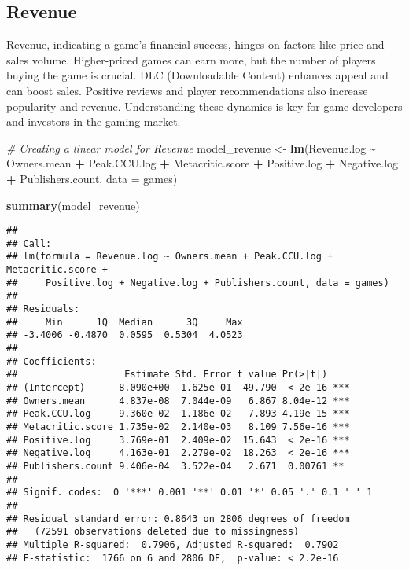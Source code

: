 \documentclass[
]{article}
\newenvironment{Shaded}{\begin{snugshade}}{\end{snugshade}}
\newcommand{\AttributeTok}[1]{\textcolor[rgb]{0.13,0.29,0.53}{#1}}
\newcommand{\CommentTok}[1]{\textcolor[rgb]{0.56,0.35,0.01}{\textit{#1}}}
\newcommand{\FunctionTok}[1]{\textcolor[rgb]{0.13,0.29,0.53}{\textbf{#1}}}
\newcommand{\NormalTok}[1]{#1}
\newcommand{\OtherTok}[1]{\textcolor[rgb]{0.56,0.35,0.01}{#1}}
\newcommand{\SpecialCharTok}[1]{\textcolor[rgb]{0.81,0.36,0.00}{\textbf{#1}}}
\begin{document}
\hypertarget{revenue}{%
\subsection{Revenue}\label{revenue}}

Revenue, indicating a game's financial success, hinges on factors like
price and sales volume. Higher-priced games can earn more, but the
number of players buying the game is crucial. DLC (Downloadable Content)
enhances appeal and can boost sales. Positive reviews and player
recommendations also increase popularity and revenue. Understanding
these dynamics is key for game developers and investors in the gaming
market.

\begin{Shaded}
\begin{Highlighting}[]
\CommentTok{\# Creating a linear model for Revenue}
\NormalTok{model\_revenue }\OtherTok{\textless{}{-}} \FunctionTok{lm}\NormalTok{(Revenue.log }\SpecialCharTok{\textasciitilde{}}\NormalTok{  Owners.mean }\SpecialCharTok{+}\NormalTok{ Peak.CCU.log }\SpecialCharTok{+}
\NormalTok{                      Metacritic.score }\SpecialCharTok{+}\NormalTok{ Positive.log }\SpecialCharTok{+}\NormalTok{ Negative.log }\SpecialCharTok{+}
\NormalTok{                      Publishers.count, }\AttributeTok{data =}\NormalTok{ games)}

\FunctionTok{summary}\NormalTok{(model\_revenue)}
\end{Highlighting}
\end{Shaded}

\begin{verbatim}
## 
## Call:
## lm(formula = Revenue.log ~ Owners.mean + Peak.CCU.log + Metacritic.score + 
##     Positive.log + Negative.log + Publishers.count, data = games)
## 
## Residuals:
##     Min      1Q  Median      3Q     Max 
## -3.4006 -0.4870  0.0595  0.5304  4.0523 
## 
## Coefficients:
##                   Estimate Std. Error t value Pr(>|t|)    
## (Intercept)      8.090e+00  1.625e-01  49.790  < 2e-16 ***
## Owners.mean      4.837e-08  7.044e-09   6.867 8.04e-12 ***
## Peak.CCU.log     9.360e-02  1.186e-02   7.893 4.19e-15 ***
## Metacritic.score 1.735e-02  2.140e-03   8.109 7.56e-16 ***
## Positive.log     3.769e-01  2.409e-02  15.643  < 2e-16 ***
## Negative.log     4.163e-01  2.279e-02  18.263  < 2e-16 ***
## Publishers.count 9.406e-04  3.522e-04   2.671  0.00761 ** 
## ---
## Signif. codes:  0 '***' 0.001 '**' 0.01 '*' 0.05 '.' 0.1 ' ' 1
## 
## Residual standard error: 0.8643 on 2806 degrees of freedom
##   (72591 observations deleted due to missingness)
## Multiple R-squared:  0.7906, Adjusted R-squared:  0.7902 
## F-statistic:  1766 on 6 and 2806 DF,  p-value: < 2.2e-16
\end{verbatim}
\end{document}
